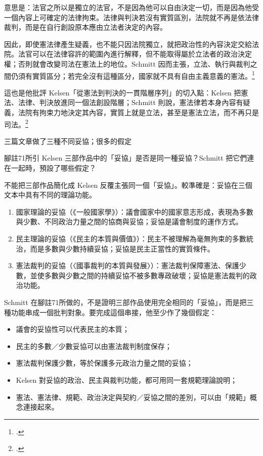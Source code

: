 意思是：法官之所以是獨立的法官，不是因為他可以自由決定一切，而是因為他受一個內容上可確定的法律拘束。法律與判決若沒有實質區別，法院就不再是依法律裁判，而是在自行創設原本應由立法者決定的內容。

因此，即使憲法律產生疑義，也不能只因法院獨立，就把政治性的內容決定交給法院。法官可以在法律容許的範圍內進行解釋，但不能取得屬於立法者的政治決定權；否則就會改變司法在憲法上的地位。Schmitt 因而主張，立法、執行與裁判之間仍須有實質區分；若完全沒有這種區分，國家就不具有自由主義意義的憲法。\footcites[36]{schmitt1931}[107--108 n.~55]{schmitt2015}

這也是他批評 Kelsen「從憲法到判決的一貫階層序列」的切入點：Kelsen 把憲法、法律、判決放進同一個法創設階層；Schmitt 則說，憲法律若本身內容有疑義，法院有拘束力地決定其內容，實質上就是立法，甚至是憲法立法，而不再只是司法。\footcites[109, 116--120]{schmitt2015}[38, 45--48]{schmitt1931}


\begin{qaprompt}
三篇文章做了三種不同妥協；很多的假定
\end{qaprompt}

\begin{qaquestion}
腳註71所引 Kelsen 三部作品中的「妥協」是否是同一種妥協？Schmitt 把它們連在一起時，預設了哪些假定？
\end{qaquestion}

不能把三部作品簡化成 Kelsen 反覆主張同一個「妥協」。較準確是：妥協在三個文本中具有不同的理論功能。

\begin{enumerate}
\def\labelenumi{\arabic{enumi}.}
\tightlist
\item
  國家理論的妥協（《一般國家學》）：議會國家中的國家意志形成，表現為多數與少數、不同政治力量之間的協商與妥協；妥協是議會制度的運作方式。
\item
  民主理論的妥協（《民主的本質與價值》）：民主不被理解為毫無拘束的多數統治，而是多數與少數持續妥協；妥協是民主正當性的實質條件。
\item
  憲法裁判的妥協（〈國事裁判的本質與發展〉）：憲法裁判保障憲法、保護少數，並使多數與少數之間的持續妥協不被多數專政破壞；妥協是憲法裁判的政治功能。
\end{enumerate}

Schmitt 在腳註71所做的，不是證明三部作品使用完全相同的「妥協」，而是把三種功能串成一個批判對象。要完成這個串接，他至少作了幾個假定：

\begin{itemize}
\tightlist
\item
  議會的妥協性可以代表民主的本質；
\item
  民主的多數／少數妥協可以由憲法裁判制度保存；
\item
  憲法裁判保護少數，等於保護多元政治力量之間的妥協；
\item
  Kelsen 對妥協的政治、民主與裁判功能，都可用同一套規範理論說明；
\item
  憲法、憲法律、規範、政治決定與契約／妥協之間的差別，可以由「規範」概念連接起來。
\end{itemize}

